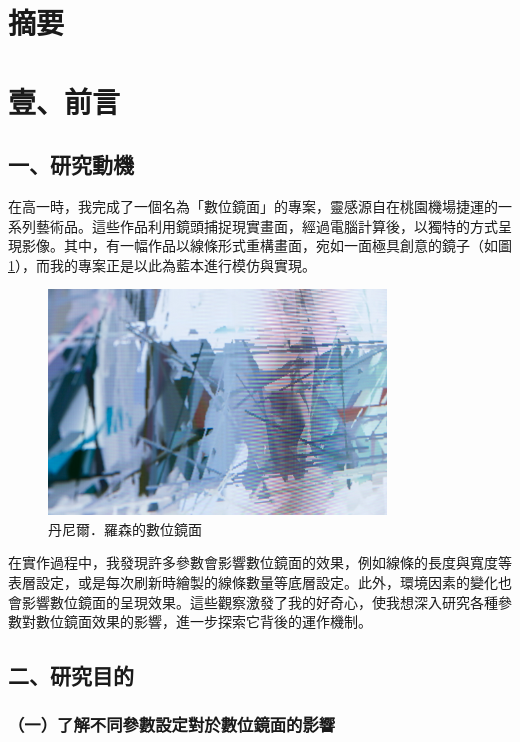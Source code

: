 \documentclass[12pt]{article}
\begin{document}
\section{摘要}

\newpage

\section{壹、前言}

\subsection{一、研究動機}

在高一時，我完成了一個名為「數位鏡面」的專案，靈感源自\textcite{husart}在桃園機場捷運的一系列藝術品。這些作品利用鏡頭捕捉現實畫面，經過電腦計算後，以獨特的方式呈現影像。其中，有一幅作品以線條形式重構畫面，宛如一面極具創意的鏡子（如圖\ref{fig:mirror_example_1}），而我的專案正是以此為藍本進行模仿與實現。

\begin{figure}[htbp]
  \centering
  \includegraphics[width=0.8\textwidth]{img//mirror_example_1.jpg}
  \caption{丹尼爾．羅森的數位鏡面}\label{fig:mirror_example_1}
\end{figure}

在實作過程中，我發現許多參數會影響數位鏡面的效果，例如線條的長度與寬度等表層設定，或是每次刷新時繪製的線條數量等底層設定。此外，環境因素的變化也會影響數位鏡面的呈現效果。這些觀察激發了我的好奇心，使我想深入研究各種參數對數位鏡面效果的影響，進一步探索它背後的運作機制。

\subsection{二、研究目的}

\subsubsection{（一）了解不同參數設定對於數位鏡面的影響}
\end{document}
